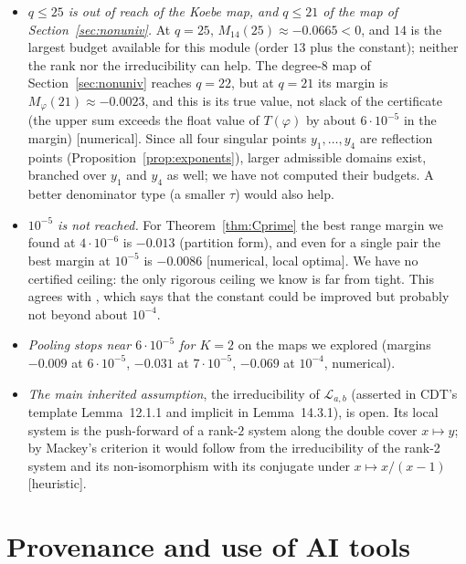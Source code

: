 \documentclass[11pt]{amsart}
\theoremstyle{definition}
\theoremstyle{remark}
\numberwithin{equation}{section}
\begin{document}
\begin{itemize}
\item \emph{$q\le25$ is out of reach of the Koebe map, and $q\le21$ of the map of Section~\ref{sec:nonuniv}.} At $q=25$,
$M_{14}(25)\approx-0.0665<0$, and $14$ is the largest budget available for this module (order $13$ plus the constant);
neither the rank nor the irreducibility can help. The degree-$8$ map of Section~\ref{sec:nonuniv} reaches $q=22$, but at
$q=21$ its margin is $M_\varphi(21)\approx-0.0023$, and this is its true value, not slack of the certificate (the upper
sum exceeds the float value of $T(\varphi)$ by about $6\cdot10^{-5}$ in the margin) [numerical]. Since all four
singular points $y_1,\dots,y_4$ are reflection points (Proposition~\ref{prop:exponents}), larger admissible domains
exist, branched over $y_1$ and $y_4$ as well; we have not computed their budgets. A better denominator type (a smaller
$\tau$) would also help.
\item \emph{$10^{-5}$ is not reached.} For Theorem~\ref{thm:Cprime} the best range margin we found at $4\cdot10^{-6}$
is $-0.013$ (partition form), and even for a single pair the best margin at $10^{-5}$ is $-0.0086$ [numerical, local
optima]. We have no certified ceiling: the only rigorous ceiling we know is far from tight.
This agrees with \cite[Remark~14.0.4]{CDT}, which says that the constant could be improved but probably not beyond
about $10^{-4}$.
\item \emph{Pooling stops near $6\cdot10^{-5}$ for $K=2$} on the maps we explored (margins $-0.009$ at $6\cdot10^{-5}$,
$-0.031$ at $7\cdot10^{-5}$, $-0.069$ at $10^{-4}$, numerical).
\item \emph{The main inherited assumption}, the irreducibility of $\mathcal L_{a,b}$ (asserted in CDT's template
Lemma~12.1.1 and implicit in Lemma~14.3.1), is open. Its local system is the push-forward of a rank-$2$ system along the
double cover $x\mapsto y$; by Mackey's criterion it would follow from the irreducibility of the rank-2 system and its
non-isomorphism with its conjugate under $x\mapsto x/(x-1)$ [heuristic].
\end{itemize}

\section{Provenance and use of AI tools}\label{sec:provenance}
\end{document}
